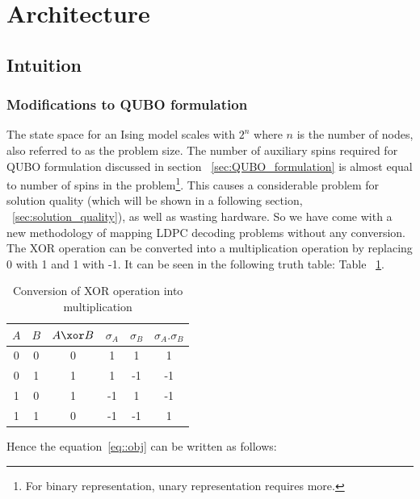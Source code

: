 \section {Architecture}
\label{sec:arch}



\subsection{Intuition}



\subsubsection{Modifications to QUBO formulation}\label{secc:m_qubo}The state space for an Ising model scales with $2^n$ where $n$ is the number of nodes, also referred to as the problem size. The number of  auxiliary spins required for QUBO formulation discussed in section ~\ref{sec:QUBO_formulation} is almost equal to number of spins in the problem\footnote{ For binary representation, unary representation requires more.}. This causes a considerable problem for solution quality (which will be shown in a following section, ~\ref{sec:solution_quality}), as well as wasting hardware. So we have come with a new methodology of mapping LDPC decoding problems without any conversion. The XOR operation can be converted into a multiplication operation by replacing 0 with 1 and 1 with -1. It can be seen in the following truth table: Table ~\ref{tabel:truth_table}. 

\begin{table}[h]\centering
\caption{Conversion of XOR operation into multiplication  }
\label{tabel:truth_table}
\begin{tabular}{|c|c|c|c|c|c|} 
\hline
$A$ &  $B$ &  $A \xor B$ & $\sigma_A$ & $\sigma_B$ & $\sigma_A.\sigma_B$ \\ 
\hline\hline
 0 &  0  & 0 & 1 & 1 & 1\\  
\hline
0  &  1 & 1 & 1 & -1 & -1\\   
\hline
1    & 0 & 1 & -1& 1& -1\\ 
\hline
1    & 1 & 0  & -1 & -1 & 1\\ 
\hline
\end{tabular}
\end{table}

Hence the equation~\ref{eq::obj} can be written as follows:

